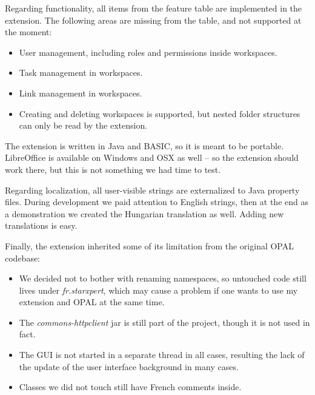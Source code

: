 Regarding functionality, all items from the feature table are implemented in
the extension. The following areas are missing from the table, and not
supported at the moment:

\begin{itemize}
\item User management, including roles and permissions inside workspaces.
\item Task management in workspaces.
\item Link management in workspaces.
\item Creating and deleting workspaces is supported, but nested folder
structures can only be read by the extension.
\end{itemize}

The extension is written in Java and BASIC, so it is meant to be portable.
LibreOffice is available on Windows and OSX as well -- so the extension should
work there, but this is not something we had time to test.

Regarding localization, all user-visible strings are externalized to Java
property files. During development we paid attention to English strings, then at
the end as a demonstration we created the Hungarian translation as well. Adding
new translations is easy.

Finally, the extension inherited some of its limitation from the original OPAL
codebase:

\begin{itemize}
\item We decided not to bother with renaming namespaces, so untouched code still
lives under \emph{fr.starxpert}, which may cause a problem if one wants to use
my extension and OPAL at the same time.
\item The \emph{commons-httpclient} jar is still part of the project, though it is not used in fact.
\item The GUI is not started in a separate thread in all cases, resulting the
lack of the update of the user interface background in many cases.
\item Classes we did not touch still have French comments inside.
\end{itemize}
